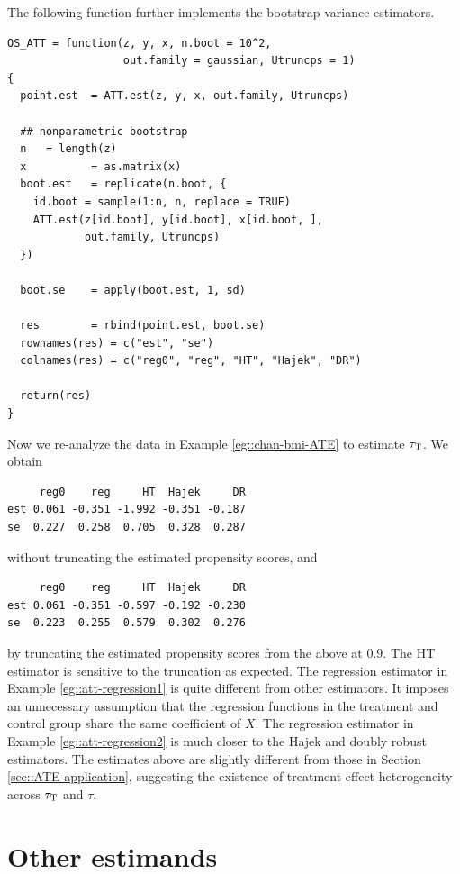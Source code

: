 The following  function further implements the bootstrap variance estimators. 

\begin{lstlisting}
OS_ATT = function(z, y, x, n.boot = 10^2,
                  out.family = gaussian, Utruncps = 1)
{
  point.est  = ATT.est(z, y, x, out.family, Utruncps)
  
  ## nonparametric bootstrap
  n   = length(z)
  x          = as.matrix(x)
  boot.est   = replicate(n.boot, {
    id.boot = sample(1:n, n, replace = TRUE)
    ATT.est(z[id.boot], y[id.boot], x[id.boot, ], 
            out.family, Utruncps)
  })
  
  boot.se    = apply(boot.est, 1, sd)
  
  res        = rbind(point.est, boot.se)
  rownames(res) = c("est", "se")
  colnames(res) = c("reg0", "reg", "HT", "Hajek", "DR")
  
  return(res)
}
\end{lstlisting}

 
Now we re-analyze the data in Example \ref{eg::chan-bmi-ATE} to estimate $\tau_\textsc{T}$. 
We obtain
\begin{lstlisting}
     reg0    reg     HT  Hajek     DR
est 0.061 -0.351 -1.992 -0.351 -0.187
se  0.227  0.258  0.705  0.328  0.287
\end{lstlisting}
without truncating the estimated propensity scores, and
\begin{lstlisting}
     reg0    reg     HT  Hajek     DR
est 0.061 -0.351 -0.597 -0.192 -0.230
se  0.223  0.255  0.579  0.302  0.276
\end{lstlisting}
by truncating the estimated propensity scores from the above at $0.9$. The HT estimator is sensitive to the truncation as expected. The regression estimator in Example \ref{eg::att-regression1} is quite different from other estimators. It imposes an unnecessary assumption that the regression functions in the treatment and control group share the same coefficient of $X$. The regression estimator in Example \ref{eg::att-regression2} is much closer to the Hajek and doubly robust estimators. The estimates above are slightly different from those in Section \ref{sec::ATE-application}, suggesting the existence of treatment effect heterogeneity across $\tau_\textsc{T}$ and $\tau$. 



\section{Other estimands}\label{sec::other-estmand-overlap}


